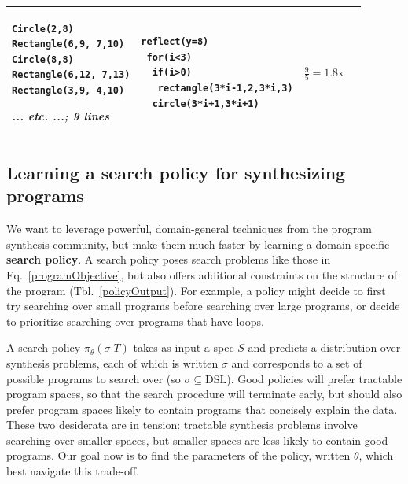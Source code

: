 \documentclass{article}
\theoremstyle{definition}
\begin{document}
\begin{table}[t]
\begin{tabular}{m{1.5cm}llc}
\begin{minipage}{\exampleTraceSize}\begin{lstlisting}
Circle(2,8)
Rectangle(6,9, 7,10)
Circle(8,8)
Rectangle(6,12, 7,13)
Rectangle(3,9, 4,10)
\end{lstlisting}\small\emph{... etc. ...; 9 lines}
  \end{minipage}&\begin{minipage}{\exampleProgramSize}
\begin{lstlisting}
reflect(y=8)
 for(i<3)
  if(i>0)
   rectangle(3*i-1,2,3*i,3)
  circle(3*i+1,3*i+1)
\end{lstlisting}
\end{minipage}&$\frac{9}{5} = 1.8\text{x}$ \\\bottomrule
  \end{tabular}
  \end{table}

\subsection{Learning a search policy for synthesizing programs}\label{learningASearchPolicy}

We want to leverage powerful, domain-general techniques from the program synthesis community,
but make them much faster by
learning a domain-specific \textbf{search policy}.
A search policy poses search problems
like those in Eq.~\ref{programObjective},
but also offers additional constraints on the structure of the program (Tbl.~\ref{policyOutput}).
For example, a policy might decide to first try searching over small programs before searching over large programs,
or decide to prioritize searching over programs that have loops.

A search policy $\pi_\theta(\sigma  | T )$ takes as input a spec $S$ and predicts a distribution over synthesis problems, each of which is written $\sigma $ and corresponds to a set of possible programs to search over (so $\sigma \subseteq \text{DSL}$).
Good policies will prefer tractable program spaces,
so that the search procedure will terminate early, 
but should also prefer program spaces likely to contain
programs that concisely explain the data.
These two desiderata are in tension:
tractable synthesis problems involve searching over smaller spaces,
but smaller spaces are less likely to contain good programs.
Our goal now is to find the parameters of the policy, written $\theta$, which best navigate this trade-off.
\end{document}
